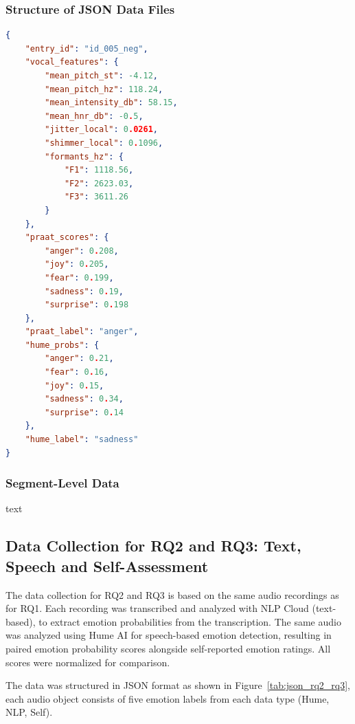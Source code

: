 \subsubsection{Structure of JSON Data Files}
\begin{center}
\begin{minipage}{0.7\textwidth} 
\begin{lstlisting}[language=json, caption={Example of stored JSON structure for vocal features vs. Hume}]
    {
    "entry_id": "id_005_neg",
    "vocal_features": {
        "mean_pitch_st": -4.12,
        "mean_pitch_hz": 118.24,
        "mean_intensity_db": 58.15,
        "mean_hnr_db": -0.5,
        "jitter_local": 0.0261,
        "shimmer_local": 0.1096,
        "formants_hz": {
            "F1": 1118.56,
            "F2": 2623.03,
            "F3": 3611.26
        }
    },
    "praat_scores": {
        "anger": 0.208,
        "joy": 0.205,
        "fear": 0.199,
        "sadness": 0.19,
        "surprise": 0.198
    },
    "praat_label": "anger",
    "hume_probs": {
        "anger": 0.21,
        "fear": 0.16,
        "joy": 0.15,
        "sadness": 0.34,
        "surprise": 0.14
    },
    "hume_label": "sadness"
}
\end{lstlisting}
\end{minipage}
\end{center} 
\subsubsection{Segment-Level Data}
text

\subsection{Data Collection for RQ2 and RQ3: Text, Speech and Self-Assessment}
\label{sec:datacoll_rq2_rq3}


The data collection for RQ2 and RQ3 is based on the same audio recordings as for RQ1. 
Each recording was transcribed and analyzed with NLP Cloud (text-based), to extract emotion probabilities from the transcription. The same audio was analyzed using Hume AI for speech-based emotion detection, resulting in paired emotion probability scores alongside self-reported emotion ratings. All scores were normalized for comparison.

The data was structured in JSON format as shown in Figure~\ref{tab:json_rq2_rq3}, each audio object consists of five emotion labels from each data type (Hume, NLP, Self). 

